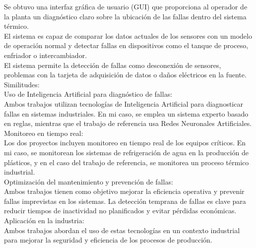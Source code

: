 Se obtuvo una interfaz gráfica de usuario (GUI) que proporciona al operador de la planta un diagnóstico claro sobre la ubicación de las fallas dentro del sistema térmico.\\
El sistema es capaz de comparar los datos actuales de los sensores con un modelo de operación normal y detectar fallas en dispositivos como el tanque de proceso, enfriador o intercambiador.\\
El sistema permite la detección de fallas como desconexión de sensores, problemas con la tarjeta de adquisición de datos o daños eléctricos en la fuente.\\
Similitudes: \\
Uso de Inteligencia Artificial para diagnóstico de fallas: \\
Ambos trabajos utilizan tecnologías de Inteligencia Artificial para diagnosticar fallas en sistemas industriales. En mi caso, se emplea un sistema experto basado en reglas, mientras que el trabajo de referencia usa Redes Neuronales Artificiales.\\
Monitoreo en tiempo real: \\
Los dos proyectos incluyen monitoreo en tiempo real de los equipos críticos. En mi caso, se monitorean los sistemas de refrigeración de agua en la producción de plásticos, y en el caso del trabajo de referencia, se monitorea un proceso térmico industrial.\\
Optimización del mantenimiento y prevención de fallas: \\
Ambos trabajos tienen como objetivo mejorar la eficiencia operativa y prevenir fallas imprevistas en los sistemas. La detección temprana de fallas es clave para reducir tiempos de inactividad no planificados y evitar pérdidas económicas.\\
Aplicación en la industria: \\
Ambos trabajos abordan el uso de estas tecnologías en un contexto industrial para mejorar la seguridad y eficiencia de los procesos de producción.\\

